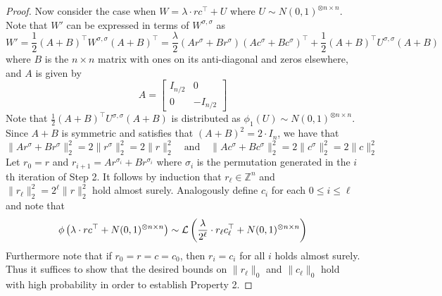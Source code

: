 \begin{proof}
Now consider the case when $W = \lambda \cdot r c^\top + U$ where $U \sim N(0, 1)^{\otimes n \times n}$. Note that $W'$ can be expressed in terms of $W^{\sigma, \sigma}$ as
$$W' = \frac{1}{2} \left( A + B \right)^\top W^{\sigma, \sigma} \left( A + B \right)^\top = \frac{\lambda}{2} \left( A r^\sigma + B r^\sigma \right) \left( Ac^\sigma + Bc^\sigma \right)^\top + \frac{1}{2} \left( A + B \right)^\top U^{\sigma, \sigma} \left( A + B \right)$$
where $B$ is the $n \times n$ matrix with ones on its anti-diagonal and zeros elsewhere, and $A$ is given by
$$A = \left[ \begin{matrix} I_{n/2} & 0 \\ 0 & -I_{n/2} \end{matrix} \right]$$
Note that $\frac{1}{2} \left( A + B \right)^\top U^{\sigma, \sigma} \left( A + B \right)$ is distributed as $\phi_1(U) \sim N(0, 1)^{\otimes n \times n}$. Since $A + B$ is symmetric and satisfies that $(A + B)^2 = 2 \cdot I_n$, we have that
$$\| Ar^\sigma + Br^\sigma \|_2^2 = 2 \| r^\sigma \|_2^2 = 2\| r \|_2^2 \quad \text{and} \quad \| Ac^\sigma + Bc^\sigma \|_2^2 = 2 \| c^\sigma \|_2^2 = 2\| c \|_2^2$$
Let $r_0 = r$ and $r_{i+1} = A r^{\sigma_i} + B r^{\sigma_i}$ where $\sigma_i$ is the permutation generated in the $i$th iteration of Step 2. It follows by induction that $r_\ell \in \mathbb{Z}^n$ and $\| r_\ell \|_2^2 = 2^\ell \| r \|_2^2$ hold almost surely. Analogously define $c_i$ for each $0 \le i \le \ell$ and note that
$$\phi\left(\lambda \cdot r c^\top + N(0, 1)^{\otimes n \times n}\right) \sim \mathcal{L}\left( \frac{\lambda}{2^\ell} \cdot r_\ell c_\ell^\top + N(0, 1)^{\otimes n \times n}\right)$$
Furthermore note that if $r_0 = r = c = c_0$, then $r_i = c_i$ for all $i$ holds almost surely. Thus it suffices to show that the desired bounds on $\| r_\ell \|_0$ and $\| c_\ell \|_0$ hold with high probability in order to establish Property 2.


\end{proof}
